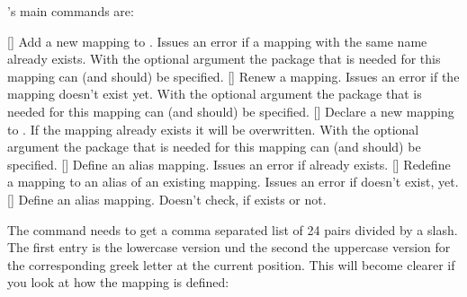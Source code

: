 \documentclass[load-preamble+,scrartcl={listof=totoc}]{cnltx-doc}
\begin{document}
\chemgreek's main commands are:
\begin{commands}
  []
    Add a new mapping to \chemgreek.  Issues an error if a
    mapping with the same name already exists.  With the optional argument the
    package that is needed for this mapping can (and should) be specified.
  []
    Renew a \chemgreek{} mapping.  Issues an error if the
    mapping doesn't exist yet.  With the optional argument the package that is
    needed for this mapping can (and should) be specified.
  []
    Declare a new mapping to \chemgreek.  If the mapping
    already exists it will be overwritten.  With the optional argument the
    package that is needed for this mapping can (and should) be specified.
  []
    Define an alias mapping.  Issues an error if  already exists.
  []
    Redefine a mapping to an alias of an existing mapping.
    Issues an error if  doesn't exist, yet.
  []
    Define an alias mapping.  Doesn't check, if  exists or not.
\end{commands}

The command  needs to get a comma separated list of
24 pairs divided by a slash.  The first entry is the lowercase version und the
second the uppercase version for the corresponding greek letter at the current
position.  This will become clearer if you look at how the 
mapping is defined:
\end{document}
